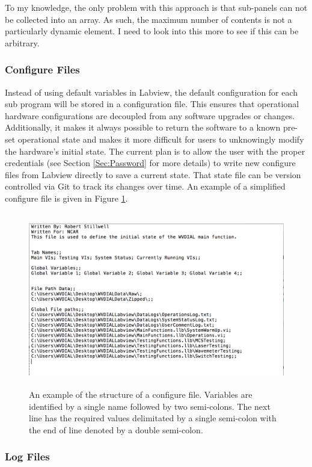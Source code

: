 To my knowledge, the only problem with this approach is that sub-panels can not be collected into an array. As such, the maximum number of contents is not a particularly dynamic element. I need to look into this more to see if this can be arbitrary. 

\subsubsection{Configure Files}
Instead of using default variables in Labview, the default configuration for each sub program will be stored in a configuration file. This ensures that operational hardware configurations are decoupled from any software upgrades or changes. Additionally, it makes it always possible to return the software to a known pre-set operational state and makes it more difficult for users to unknowingly modify the hardware's initial state. The current plan is to allow the user with the proper credentials (see Section \ref{Sec:Password} for more details) to write new configure files from Labview directly to save a current state. That state file can be version controlled via Git to track its changes over time. An example of a simplified configure file is given in Figure \ref{Fig:ConfigureFile}. 

\begin{figure}[!h]\centering
\includegraphics[height=3in]{Figures/ConfigureFileExample}
\caption{An example of the structure of a configure file. Variables are identified by a single name followed by two semi-colons. The next line has the required values delimitated by a single semi-colon with the end of line denoted by a double semi-colon.}\label{Fig:ConfigureFile}
\end{figure}

\subsubsection{Log Files}

